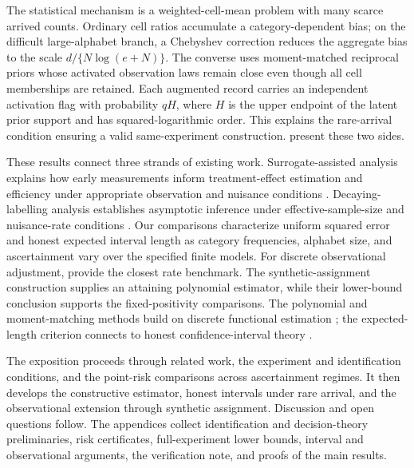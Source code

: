 The statistical mechanism is a weighted-cell-mean problem with many scarce arrived counts. Ordinary cell ratios accumulate a category-dependent bias; on the difficult large-alphabet branch, a Chebyshev correction reduces the aggregate bias to the scale \(d/\{N\log(e+N)\}\). The converse uses moment-matched reciprocal priors whose activated observation laws remain close even though all cell memberships are retained. Each augmented record carries an independent activation flag with probability \(qH\), where \(H\) is the upper endpoint of the latent prior support and has squared-logarithmic order. This explains the rare-arrival condition ensuring a valid same-experiment construction.  present these two sides.

These results connect three strands of existing work. Surrogate-assisted analysis explains how early measurements inform treatment-effect estimation and efficiency under appropriate observation and nuisance conditions \citep[Theorems 2.1--2.2 and 4.1--4.2]{KallusMao2025}. Decaying-labelling analysis establishes asymptotic inference under effective-sample-size and nuisance-rate conditions \citep[Theorems 2.2 and 4.1, equation (2.3)]{ZhangChakraborttyBradic2025}. Our comparisons characterize uniform squared error and honest expected interval length as category frequencies, alphabet size, and ascertainment vary over the specified finite models. For discrete observational adjustment, \citet[Assumption 2, Theorems 1--2, Section 3.2, and Appendix C.5]{ZengBalakrishnanHanKennedy2026} provide the closest rate benchmark. The synthetic-assignment construction supplies an attaining polynomial estimator, while their lower-bound conclusion supports the fixed-positivity comparisons. The polynomial and moment-matching methods build on discrete functional estimation \citep{JiaoVenkatHanWeissman2015,Wu2016,WuYang2019}; the expected-length criterion connects to honest confidence-interval theory \citep{Donoho1994,Cai2004,ArmstrongKolesar2020}.



The exposition proceeds through related work, the experiment and identification conditions, and the point-risk comparisons across ascertainment regimes. It then develops the constructive estimator, honest intervals under rare arrival, and the observational extension through synthetic assignment. Discussion and open questions follow. The appendices collect identification and decision-theory preliminaries, risk certificates, full-experiment lower bounds, interval and observational arguments, the verification note, and proofs of the main results.

